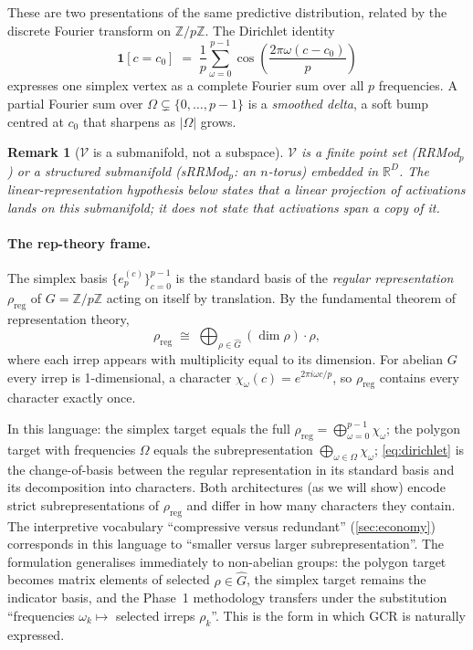 \documentclass[11pt,a4paper]{article}
\newtheorem{remark}{Remark}
\begin{document}
These are two presentations of the same predictive distribution, related by the discrete Fourier transform on $\mathbb{Z}/p\mathbb{Z}$. The Dirichlet identity
\begin{equation}\label{eq:dirichlet}
    \mathbf{1}[c = c_0] \;=\; \frac{1}{p}\sum_{\omega=0}^{p-1}\cos\!\left(\frac{2\pi\omega(c - c_0)}{p}\right)
\end{equation}
expresses one simplex vertex as a complete Fourier sum over all $p$ frequencies. A partial Fourier sum over $\Omega \subsetneq \{0, \ldots, p-1\}$ is a \emph{smoothed delta}, a soft bump centred at $c_0$ that sharpens as $|\Omega|$ grows.

\begin{remark}[$\mathcal{V}$ is a submanifold, not a subspace]
$\mathcal{V}$ is a finite point set (RRMod$_p$) or a structured submanifold (sRRMod$_p$: an $n$-torus) embedded in $\mathbb{R}^D$. The linear-representation hypothesis below states that a linear projection of activations lands on this submanifold; it does not state that activations span a copy of it.
\end{remark}

\paragraph{The rep-theory frame.}\label{para:reptheory}
The simplex basis $\{e_p^{(c)}\}_{c=0}^{p-1}$ is the standard basis of the \emph{regular representation} $\rho_{\mathrm{reg}}$ of $G = \mathbb{Z}/p\mathbb{Z}$ acting on itself by translation. By the fundamental theorem of representation theory,
\begin{equation}\label{eq:regrep}
    \rho_{\mathrm{reg}} \;\cong\; \bigoplus_{\rho \in \widehat{G}} (\dim \rho) \cdot \rho,
\end{equation}
where each irrep appears with multiplicity equal to its dimension. For abelian $G$ every irrep is 1-dimensional, a character $\chi_\omega(c) = e^{2\pi i \omega c / p}$, so $\rho_{\mathrm{reg}}$ contains every character exactly once.

In this language: the simplex target equals the full $\rho_{\mathrm{reg}} = \bigoplus_{\omega=0}^{p-1} \chi_\omega$; the polygon target with frequencies $\Omega$ equals the subrepresentation $\bigoplus_{\omega \in \Omega} \chi_\omega$; \eqref{eq:dirichlet} is the change-of-basis between the regular representation in its standard basis and its decomposition into characters. Both architectures (as we will show) encode strict subrepresentations of $\rho_{\mathrm{reg}}$ and differ in how many characters they contain. The interpretive vocabulary ``compressive versus redundant'' (\cref{sec:economy}) corresponds in this language to ``smaller versus larger subrepresentation''. The formulation generalises immediately to non-abelian groups: the polygon target becomes matrix elements of selected $\rho \in \widehat{G}$, the simplex target remains the indicator basis, and the Phase~1 methodology transfers under the substitution ``frequencies $\omega_k \mapsto$ selected irreps $\rho_k$''. This is the form in which GCR \citep{chughtai2023toy} is naturally expressed.
\end{document}
